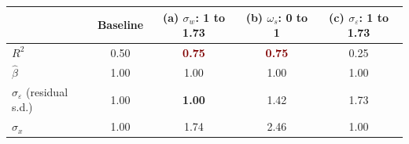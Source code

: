 \begin{tabular}{@{}lcccc@{}}
\toprule
 & Baseline & (a) $\sigma_w$: 1 to 1.73 & (b) $\omega_s$: 0 to 1 & (c) $\sigma_\varepsilon$: 1 to 1.73 \\
\midrule
$R^2$ & 0.50 & \textcolor{Maroon}{\bfseries 0.75} & \textcolor{Maroon}{\bfseries 0.75} & 0.25 \\
$\hat\beta$ & 1.00 & 1.00 & 1.00 & 1.00 \\
$\hat\sigma_\varepsilon$ (residual s.d.) & 1.00 & \textcolor{DeepNavy}{\bfseries 1.00} & 1.42 & 1.73 \\
$\hat\sigma_x$ & 1.00 & 1.74 & 2.46 & 1.00 \\
\bottomrule
\end{tabular}
